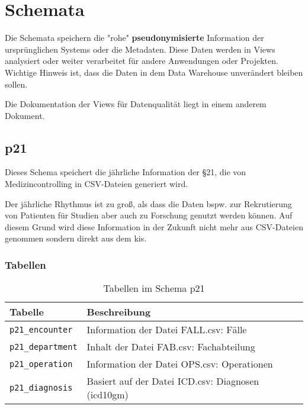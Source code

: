 \chapter{Schemata}
\label{ch: schema}

Die Schemata speichern die "rohe" \textbf{pseudonymisierte} Information der ursprünglichen Systems oder die Metadaten. Diese Daten werden in Views analysiert oder weiter verarbeitet für andere Anwendungen oder Projekten. Wichtige Hinweis ist, dass die Daten in dem Data Warehouse unverändert bleiben sollen.

Die Dokumentation der Views für Datenqualität liegt in einem anderem Dokument.
  \section{p21}
  Dieses Schema speichert die jährliche Information der \S21, die von Medizincontrolling in CSV-Dateien generiert wird. 
  
  Der jährliche Rhythmus ist zu groß, als dass die Daten bspw. zur Rekrutierung von Patienten für Studien aber auch zu Forschung genutzt werden können. Auf diesem Grund wird diese Information in der Zukunft nicht mehr aus CSV-Dateien genommen sondern direkt aus dem \ac{kis}.

  \subsection{Tabellen}
  \begin{table}[ht]
  	\centering   
  	\caption{Tabellen im Schema p21}
  	\begin{tabular}{||l|l||}
  		\hline
  		Tabelle & Beschreibung \\ [0.5ex]
  		\hline\hline
  		\texttt{p21\_encounter} & Information der Datei FALL.csv: Fälle \\
  		\hline
  		\texttt{p21\_department} & Inhalt der Datei  FAB.csv: Fachabteilung \\
  		\hline
  		\texttt{p21\_operation} & Information der Datei  OPS.csv: Operationen \\
  		\hline
  		\texttt{p21\_diagnosis} & Basiert auf der Datei ICD.csv: Diagnosen (\ac{icd10gm}) \\
        \hline
  	\end{tabular}
  \end{table}
  
